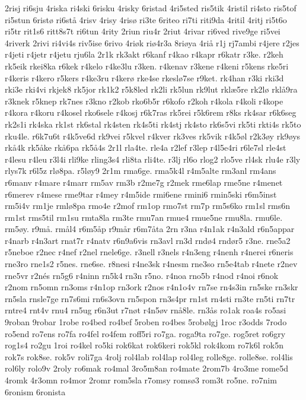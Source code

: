 {2risj
ri6sju
4riska
ri4ski
6risku
4risky
6ristad
4ri5sted
ris5tik
4ristil
ri4sto
ris5tof
ri5stun
6ristø
ri6stå
4risv
4risy
4risø
ri3te
6riteo
ri7ti
riti9da
4ritil
4ritj
ri5t6o
ri5tr
rit1s6
ritt8s7t
ri6tun
4rity
2riun
riu4r
2riut
4rivar
ri6ved
rive9ge
ri5vei
4riverk
2rivi
ri4vi4s
riv5ise
6rivo
4riøk
riø4r3a
8riøya
4riå
r1j
rj7ambi
r4jere
r2jes
r4jeti
r4jetr
r4jetu
rju6la
2r1k
rk3akt
r6kanf
r4kao
r4kapr
r6katr
r3ke.
r2keh
rk5eik
rkei8ka
r6kek
r4kelo
r4ke3lu
r3ken.
r4kenav
r3kene
r4keni
r5kens
rke5ri
r4keris
r4kero
r5kers
r4ke3ru
r4kerø
rke4se
rkeslø7se
r9ket.
rk4han
r3ki
rki3d
rki3e
rki4vi
rkjek8
rk5jor
rk1k2
r5k8led
rk2li
rk5lun
rk9lut
rklæ5re
rk2lø
rklå9ra
r3knek
r5knep
rk7nes
r3kno
r2kob
rko6b5r
r6kofo
r2koh
r4kola
r4koli
r4kope
r4kora
r4koru
r4kosel
rko6sele
r4kosj
r6k7ras
rk5rei
r5k6rem
r8ks
rk4sar
r6k6seg
rk2s1i
rk4ska
rk1st
rk6stal
rk4sten
rk4s5ti
rk4stj
rk4sto
rk6s5vi
rk5ti
rkti4s
rk5to
rku4le.
r6k7u6t
r4k5ve6d
rk9vei
r5kvel
r4kver
rk3ves
rk5vik
r4k5øl
r2k3øy
rk9øys
rkå4k
rk5åke
rkå6pa
rk5å4s
2r1l
rla4te.
rle4a
r2lef
r3lep
r4l5e4ri
r6le7sl
rle4st
r4lesu
r4leu
r3l4i
rli9ke
rling3s4
rli8ta
rli4te.
r3lj
rl6o
rlog2
rlo5ve
rl4sk
rlu4e
r3ly
rlys7k
r6l5z
rlø8pa.
r5løy9
2r1m
rma6ge.
rma5k4l
r4m5alte
rm3anl
rm4ans
r6manv
r4mare
r4marr
rm5av
rm3b
r2me7g
r2mek
rme6lap
rme5ne
r4menet
r6merev
r4mese
rme9tar
r4mey
r4m5ide
rmi6ene
rmini6
rmin5ski
r6m5inst
rm5i4v
rm1je
rmlø8pa
rmo4e
r2mof
rm1op
rmo7st
rm7p
rm5s6ko
rm1sl
rms6n
rm1st
rms5til
rm1su
rmta8la
rm3te
rmu7an
rmue4
rmue5ne
rmu8la.
rmu6le.
rm5øy.
r9må.
rmål4
r6m5åp
r9mår
r6m7åta
2rn
r3na
r4n1ak
r4n3ald
r6n5appar
r4narb
r4n3art
rnat7r
r4natv
r6n9a6vis
rn3avl
rn3d
rndø4
rndør5
r3ne.
rne5a2
r5neboe
r2nec
r4nef
r2nel
rnele6ge.
r3nell
r3nels
r4n3eng
r4nenh
r4nerei
r6neris
rne3ro
rne1s2
r5nes.
rne6se.
r8nesi
r4ne3sk
r4nesm
rne3so
rn5e4tab
r4nete
r2nev
rne5vr
r2nés
rn5g6
r4ninn
rn5k4
rn3n
r5no.
r4noa
rno5b
r4nod
r4noi
r6nok
r2nom
rn5omn
rn3oms
r4n1op
rn3ork
r2nos
r4n1o4v
rn7se
rn4s3in
rn5ske
rn3skr
rn5sla
rnsle7ge
rn7s6mi
rn6s3ovn
rn5spon
rn3s4pr
rn1st
rn4sti
rn3te
rn5ti
rn7tr
rntre4
rnt4v
rnu4
rn5ug
r6n3ut
r7nøt
r4n5øv
rnå8le.
rn3ås
ro1ak
roa4s
ro5asi
9roban
9robar
1robe
ro4bed
ro4bef
5roben
ro4bes
5robølgj
1roc
r3odds
7rodo
ro5end
ro7ens
ro7fa
ro4fel
ro4fem
roff5ri
ro7ga.
roga9ta
ro7ge.
rog5ret
ro6gry
rog1s4
ro2gu
1roi
ro4kel
ro5ki
rok6kat
rok6keri
rok5kl
rok4kom
ro7k6l
rok5n
rok7s
rok8se.
rok5v
roli7ga
4rolj
rol4lab
rol4lap
rol4leg
rolle8ge.
rolle8se.
rol4lis
rol6ly
rolo9v
2roly
ro6mak
ro4mal
3ro5m8an
ro4mate
2rom7b
4ro3me
rome5d
4romk
4r3omn
ro4mor
2romr
rom5sla
r7omsy
romsø3
rom3t
ro5ne.
ro7nim
6ronism
6ronista
}
